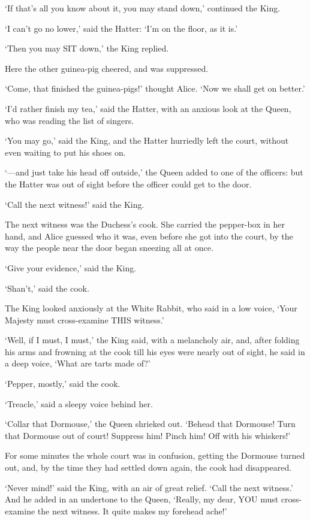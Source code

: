 \documentclass[12pt]{book}
\begin{document}
\begin{Parallel}[p]{}{}
{‘If that’s all you know about it, you may stand down,’ continued the King.

‘I can’t go no lower,’ said the Hatter: ‘I’m on the floor, as it is.’

‘Then you may SIT down,’ the King replied.

Here the other guinea-pig cheered, and was suppressed.

‘Come, that finished the guinea-pigs!’ thought Alice. ‘Now we shall get on better.’

‘I’d rather finish my tea,’ said the Hatter, with an anxious look at the Queen, who was reading the list of singers.

‘You may go,’ said the King, and the Hatter hurriedly left the court, without even waiting to put his shoes on.

‘—and just take his head off outside,’ the Queen added to one of the officers: but the Hatter was out of sight before the officer could get to the door.

‘Call the next witness!’ said the King.

The next witness was the Duchess’s cook. She carried the pepper-box in her hand, and Alice guessed who it was, even before she got into the court, by the way the people near the door began sneezing all at once.

‘Give your evidence,’ said the King.

‘Shan’t,’ said the cook.

The King looked anxiously at the White Rabbit, who said in a low voice, ‘Your Majesty must cross-examine THIS witness.’

‘Well, if I must, I must,’ the King said, with a melancholy air, and, after folding his arms and frowning at the cook till his eyes were nearly out of sight, he said in a deep voice, ‘What are tarts made of?’

‘Pepper, mostly,’ said the cook.

‘Treacle,’ said a sleepy voice behind her.

‘Collar that Dormouse,’ the Queen shrieked out. ‘Behead that Dormouse! Turn that Dormouse out of court! Suppress him! Pinch him! Off with his whiskers!’

For some minutes the whole court was in confusion, getting the Dormouse turned out, and, by the time they had settled down again, the cook had disappeared.

‘Never mind!’ said the King, with an air of great relief. ‘Call the next witness.’ And he added in an undertone to the Queen, ‘Really, my dear, YOU must cross-examine the next witness. It quite makes my forehead ache!’

}
\end{Parallel}
\end{document}
